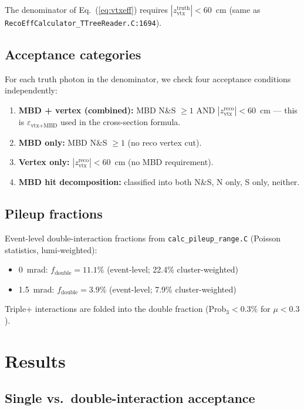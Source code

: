 \documentclass[11pt,letterpaper]{article}
\newcommand{\vtxeff}{\ensuremath{\varepsilon_{\text{vtx+MBD}}}}
\newcommand{\fdouble}{\ensuremath{f_{\text{double}}}}
\begin{document}
The denominator of Eq.~(\ref{eq:vtxeff}) requires
$|z_{\text{vtx}}^{\text{truth}}| < 60$~cm (same as
\texttt{RecoEffCalculator\_TTreeReader.C:1694}).

\subsection{Acceptance categories}
\label{sec:categories}

For each truth photon in the denominator, we check four acceptance
conditions independently:
\begin{enumerate}
  \item \textbf{MBD + vertex (combined):} MBD N\&S $\geq 1$ AND
    $|z_{\text{vtx}}^{\text{reco}}| < 60$~cm --- this is \vtxeff{}
    used in the cross-section formula.
  \item \textbf{MBD only:} MBD N\&S $\geq 1$ (no reco vertex cut).
  \item \textbf{Vertex only:} $|z_{\text{vtx}}^{\text{reco}}| < 60$~cm
    (no MBD requirement).
  \item \textbf{MBD hit decomposition:} classified into both N\&S,
    N only, S only, neither.
\end{enumerate}

\subsection{Pileup fractions}
\label{sec:fractions}

Event-level double-interaction fractions from
\texttt{calc\_pileup\_range.C} (Poisson statistics, lumi-weighted):
\begin{itemize}
  \item 0~mrad: $\fdouble = 11.1\%$ (event-level; 22.4\%
    cluster-weighted)
  \item 1.5~mrad: $\fdouble = 3.9\%$ (event-level; 7.9\%
    cluster-weighted)
\end{itemize}

Triple+ interactions are folded into the double fraction
(Prob$_3 < 0.3\%$ for $\mu < 0.3$).

\section{Results}
\label{sec:results}

\subsection{Single vs.\ double-interaction acceptance}
\label{sec:comparison}
\end{document}
